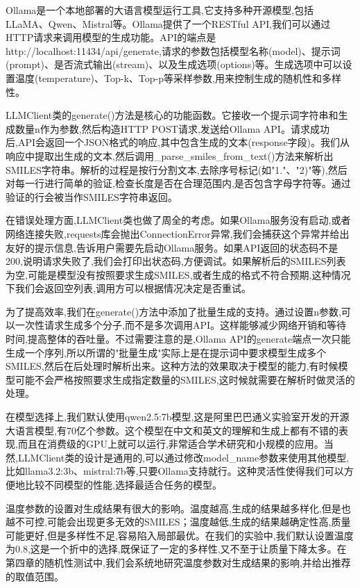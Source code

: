 Ollama是一个本地部署的大语言模型运行工具,它支持多种开源模型,包括LLaMA、Qwen、Mistral等。Ollama提供了一个RESTful API,我们可以通过HTTP请求来调用模型的生成功能。API的端点是http://localhost:11434/api/generate,请求的参数包括模型名称(model)、提示词(prompt)、是否流式输出(stream)、以及生成选项(options)等。生成选项中可以设置温度(temperature)、Top-k、Top-p等采样参数,用来控制生成的随机性和多样性。

LLMClient类的generate()方法是核心的功能函数。它接收一个提示词字符串和生成数量n作为参数,然后构造HTTP POST请求,发送给Ollama API。请求成功后,API会返回一个JSON格式的响应,其中包含生成的文本(response字段)。我们从响应中提取出生成的文本,然后调用\_parse\_smiles\_from\_text()方法来解析出SMILES字符串。解析的过程是按行分割文本,去除序号标记(如"1."、"2)"等),然后对每一行进行简单的验证,检查长度是否在合理范围内,是否包含字母字符等。通过验证的行会被当作SMILES字符串返回。

在错误处理方面,LLMClient类也做了周全的考虑。如果Ollama服务没有启动,或者网络连接失败,requests库会抛出ConnectionError异常,我们会捕获这个异常并给出友好的提示信息,告诉用户需要先启动Ollama服务。如果API返回的状态码不是200,说明请求失败了,我们会打印出状态码,方便调试。如果解析后的SMILES列表为空,可能是模型没有按照要求生成SMILES,或者生成的格式不符合预期,这种情况下我们会返回空列表,调用方可以根据情况决定是否重试。

为了提高效率,我们在generate()方法中添加了批量生成的支持。通过设置n参数,可以一次性请求生成多个分子,而不是多次调用API。这样能够减少网络开销和等待时间,提高整体的吞吐量。不过需要注意的是,Ollama API的generate端点一次只能生成一个序列,所以所谓的"批量生成"实际上是在提示词中要求模型生成多个SMILES,然后在后处理时解析出来。这种方法的效果取决于模型的能力,有时候模型可能不会严格按照要求生成指定数量的SMILES,这时候就需要在解析时做灵活的处理。

在模型选择上,我们默认使用qwen2.5:7b模型,这是阿里巴巴通义实验室开发的开源大语言模型,有70亿个参数。这个模型在中文和英文的理解和生成上都有不错的表现,而且在消费级的GPU上就可以运行,非常适合学术研究和小规模的应用。当然,LLMClient类的设计是通用的,可以通过修改model\_name参数来使用其他模型,比如llama3.2:3b、mistral:7b等,只要Ollama支持就行。这种灵活性使得我们可以方便地比较不同模型的性能,选择最适合任务的模型。

温度参数的设置对生成结果有很大的影响。温度越高,生成的结果越多样化,但是也越不可控,可能会出现更多无效的SMILES；温度越低,生成的结果越确定性高,质量可能更好,但是多样性不足,容易陷入局部最优。在我们的实验中,我们默认设置温度为0.8,这是一个折中的选择,既保证了一定的多样性,又不至于让质量下降太多。在第四章的随机性测试中,我们会系统地研究温度参数对生成结果的影响,并给出推荐的取值范围。


